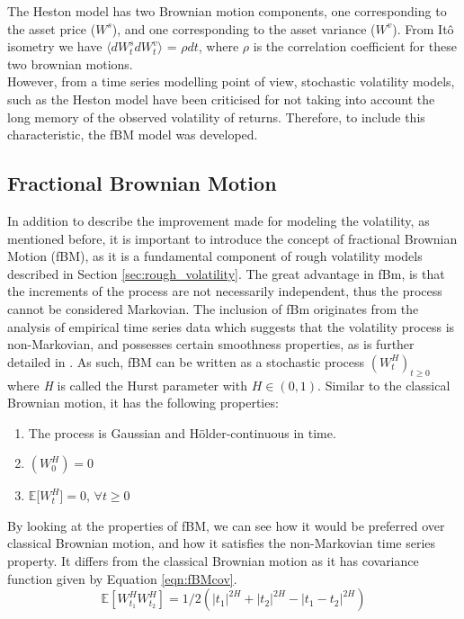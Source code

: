 \documentclass[12pt,oneside]{article}
\begin{document}
The Heston model has two Brownian motion components, one corresponding to the asset price ($W^s$), and one corresponding to the asset variance ($W^v$). From It\^o isometry we have $\langle  dW_t^{s} dW_t^{v}\rangle$ = $\rho dt$, where $\rho$ is the correlation coefficient for these two brownian motions.
\\

However, from a time series modelling point of view, stochastic volatility models, such as the Heston model have been criticised for not taking into account the long memory of the observed volatility of returns. Therefore, to include this characteristic, the fBM model was developed. 

\subsection{Fractional Brownian Motion}
\label{sec:fractionalBm}
In addition to describe the improvement made for modeling the volatility, as mentioned before, it is important to introduce the concept of fractional Brownian Motion (fBM), as it is a fundamental component of rough volatility models described in Section \ref{sec:rough_volatility}. The great advantage in fBm, is that the increments of the process are not necessarily independent, thus the process cannot be considered Markovian. The inclusion of fBm originates from the analysis of empirical time series data which suggests that the volatility process is non-Markovian, and possesses certain smoothness properties, as is further detailed in \cite{Gatheral2014}. As such, fBM can be written as a stochastic process $(W^H_t)_{t\ge0}$ where \textit{H} is called the Hurst parameter with $\textit{H} \in (0,1)$. Similar to the classical Brownian motion, it has the following properties: 
\begin{enumerate} 
\item The process is Gaussian and H\"{o}lder-continuous in time. 
\item $(\textit{$W^H_0$})=0$  
\item $\mathbb{E}$[\textit{$W^H_t$}]$=0$,
$\forall t \ge 0$ 
\end{enumerate}

 By looking at the properties of fBM, we can see how it would be preferred over classical Brownian motion, and how it satisfies the non-Markovian time series property. It differs from the classical Brownian motion as it has covariance function given by Equation \ref{eqn:fBMcov}.
\begin{equation}
\label{eqn:fBMcov}
\mathbb{E}[W^H_{t_1}W^H_{t_2}]=1/2(|t_1|^{2H}+|t_2|^{2H}-|t_1-t_2|^{2H})
\end{equation}
\end{document}
